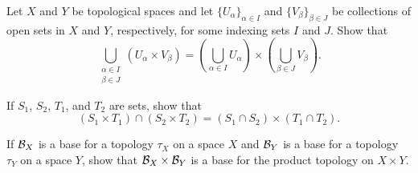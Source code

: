 \item \label{ex:unions_cross_products} Let $X$ and $Y$ be topological spaces and let $\{U_{\alpha}\}_{\alpha \in I}$ and $\{V_{\beta}\}_{\beta \in J}$ be collections of open sets in $X$ and $Y$, respectively, for some indexing sets $I$ and $J$. Show that 
\[\bigcup_{\substack{\alpha \in I \\ \beta \in J}} (U_{\alpha} \times V_{\beta}) = \left(\bigcup_{\alpha \in I} U_{\alpha} \right) \times  \left(\bigcup_{\beta \in J} V_{\beta} \right).\]

\begin{comment}

\ExerciseSolution Let $(x,y) \in \bigcup_{\substack{\alpha \in I \\ \beta \in J}} (U_{\alpha} \times V_{\beta})$. Then there exist $\delta \in I$ and $\gamma \in J$ such that $(x,y) \in U_{\delta} \times V_{\gamma}$. But $U_{\delta} \subseteq \bigcup_{\alpha \in I} U_{\alpha}$ and $V_{\gamma} \subseteq \bigcup_{\beta \in J} V_{\beta} $, so 
\[(x,y) \in U_{\delta} \times V_{\gamma} \subseteq \left(\bigcup_{\alpha \in I} U_{\alpha} \right) \times  \left(\bigcup_{\beta \in J} V_{\beta} \right).\]

For the reverse containment, suppose that $(x,y) \in \left(\bigcup_{\alpha \in I} U_{\alpha} \right) \times  \left(\bigcup_{\beta \in J} V_{\beta} \right)$. Then $x \in \bigcup_{\alpha \in I} U_{\alpha}$ and $y \in \bigcup_{\beta \in J} V_{\beta}$. So there exist $\beta \in I$ and $\gamma \in J$ such that $x \in U_{\beta}$ and $y \in V_{\gamma}$. Thus, 
\[(x,y) \in U_{\beta} \times V_{\gamma} \subseteq \bigcup_{\substack{\alpha \in I \\ \beta \in J}} (U_{\alpha} \times V_{\beta}).\]

\end{comment}


\item 
\ba

\item If $S_1$, $S_2$, $T_1$, and $T_2$ are sets, show that 
\[(S_1 \times T_1) \cap (S_2 \times T_2) = (S_1 \cap S_2) \times (T_1 \cap T_2).\]

\item If $\mathcal{B}_X$ is a base for a topology $\tau_X$ on a space $X$ and $\mathcal{B}_Y$ is a base for a topology $\tau_Y$ on a space $Y$, show that $\mathcal{B}_X \times \mathcal{B}_Y$ is a base for the product topology on $X \times Y$. 

\ea

